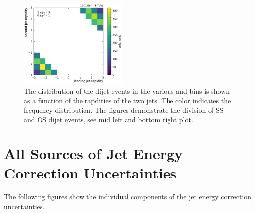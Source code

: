 \begin{figure}[htbp]
    \includegraphics[width=0.47\textwidth]{figures/measurement/jet12_rapidity_yb2ys0.pdf}
    \caption[Rapidities of the two leading jets in the various \ystar and \yboost bins]{
             The distribution of the dijet events in the various \ystar and
             \yboost bins is shown as a function of the rapdities of the two jets.
             The color indicates the frequency distribution. The figures demonstrate the
             division of SS and OS dijet events, see \eg mid left and bottom right plot.}
    \label{fig:controlplots:rapidity}
\end{figure}

\section{All Sources of Jet Energy Correction Uncertainties}

The following figures show the individual components of the jet energy correction uncertainties.

